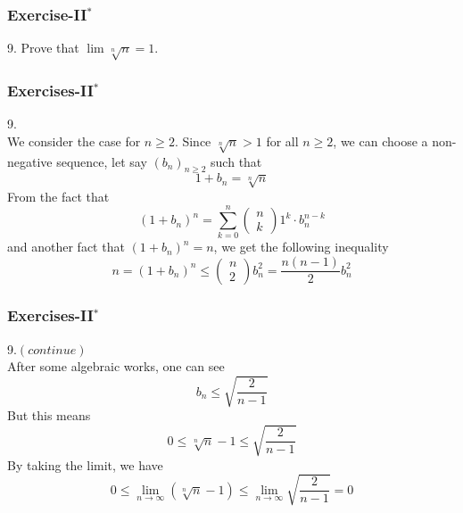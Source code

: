 \documentclass[12pt, t]{beamer}
\begin{document}
\begin{frame}
    \frametitle{Exercise-II$^*$}
9. Prove that $\lim \sqrt[n]{n}=1$.
\end{frame}

\begin{frame}
    \frametitle{Exercises-II$^*$}
9.\\
\hspace{1em} We consider the case for $n\geq 2$. Since $\sqrt[n]{n}>1$ for all $n\geq 2$, we can choose a 
non-negative sequence, let say $(b_n)_{n\geq 2}$ such that
\begin{equation*}
    1+b_n=\sqrt[n]{n}
\end{equation*}
\hspace{1em} From the fact that 
\begin{equation*}
    (1+b_n)^n=\sum^n_{k=0}\left(\begin{smallmatrix}n\\k\end{smallmatrix}\right)1^k\cdot b_n^{n-k}
\end{equation*}
and another fact that $(1+b_n)^n=n$, we get the following inequality
\begin{equation*}
    n=(1+b_n)^n\leq \left(\begin{smallmatrix}n \\ 2\end{smallmatrix}\right) b^2_n=\frac{n(n-1)}{2}b^2_n
\end{equation*}
\end{frame}

\begin{frame}
    \frametitle{Exercises-II$^*$}
9.$(continue)$\\
\hspace{1em} After some algebraic works, one can see 
\begin{equation*}
    b_n\leq\sqrt{\frac{2}{n-1}}
\end{equation*}
\hspace{1em} But this means 
\begin{equation*}
    0\leq \sqrt[n]{n}-1\leq \sqrt{\frac{2}{n-1}}
\end{equation*}
\hspace{1em} By taking the limit, we have
\begin{equation*}
    0\leq \lim_{n\rightarrow\infty}(\sqrt[n]{n}-1)\leq \lim_{n\rightarrow\infty}\sqrt{\frac{2}{n-1}}=0
\end{equation*}
\end{frame}
\end{document}
